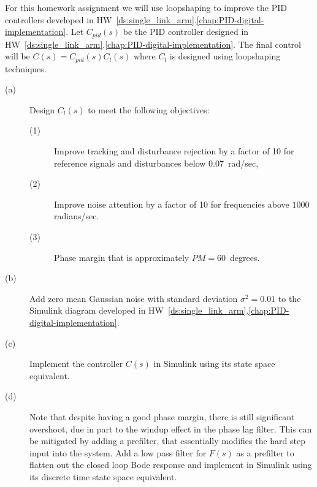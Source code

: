 
For this homework assignment we will use loopshaping to improve the PID controllers developed in HW~\ref{ds:single_link_arm}.\ref{chap:PID-digital-implementation}.  Let $C_{pid}(s)$ be the PID controller designed in HW~\ref{ds:single_link_arm}.\ref{chap:PID-digital-implementation}.  The final control will be $C(s) = C_{pid}(s)C_{l}(s)$ where $C_l$ is designed using loopshaping techniques.
\begin{description}
\item[(a)]  Design $C_l(s)$ to meet the following objectives:
	\begin{description}
	\item[(1)] Improve tracking and disturbance rejection by a factor of 10 for reference signals and disturbances below $0.07$~rad/sec, 
	\item[(2)] Improve noise attention by a factor of 10 for frequencies above $1000$ radians/sec.
	\item[(3)] Phase margin that is approximately $PM=60$~degrees.
	\end{description}
\item[(b)] Add zero mean Gaussian noise with standard deviation $\sigma^2=0.01$ to the Simulink diagram developed in HW~\ref{ds:single_link_arm}.\ref{chap:PID-digital-implementation}.
\item[(c)] Implement the controller $C(s)$ in Simulink using its state space equivalent.
\item[(d)] Note that despite having a good phase margin, there is still significant overshoot, due in part to the windup effect in the phase lag filter.  This can be mitigated by adding a prefilter, that essentially modifies the hard step input into the system.  Add a low pass filter for $F(s)$ as a prefilter to flatten out the closed loop Bode response and implement in Simulink using its discrete time state space equivalent.
\end{description}
